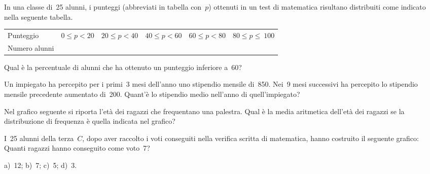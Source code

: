 \begin{esercizio}
\label{ese:A.53}
In una classe di~25 alunni, i punteggi (abbreviati in tabella con~$p$) 
ottenuti in un test di matematica risultano distribuiti come indicato nella 
seguente tabella.
\begin{center}
 \begin{tabular}{l*{5}{c}}
\toprule
Punteggio & $0 \leq p < 20$ & $20 \leq p < 40$ & $40 \leq p < 60$ & $60 
\leq p < 80$ & $80 \leq p \leq~100$ \\
Numero alunni & & & & & \\
\bottomrule
\end{tabular}
\end{center}
Qual è la percentuale di alunni che ha ottenuto un punteggio inferiore a~60?
\end{esercizio}

\begin{esercizio}
\label{ese:A.54}
Un impiegato ha percepito per i primi~3 mesi dell'anno uno stipendio 
mensile di~850\officialeuro . Nei~9 mesi successivi ha percepito
lo stipendio mensile precedente aumentato di~200\officialeuro . Quant'è lo 
stipendio medio nell'anno di quell'impiegato?
\end{esercizio}

\begin{multicols}{2}
\begin{esercizio}
\label{ese:A.55}
Nel grafico seguente si riporta l'età dei ragazzi che frequentano una 
palestra. Qual è la media aritmetica dell'età dei ragazzi
se la distribuzione di frequenza è quella indicata nel grafico?
\begin{center}
 
\end{center}
\end{esercizio}
\end{multicols}

\begin{multicols}{2}
\begin{esercizio}
\label{ese:A.56}
I~25 alunni della terza~$C$, dopo aver raccolto i voti conseguiti
nella verifica scritta di matematica, hanno costruito il seguente grafico:
Quanti ragazzi hanno conseguito come voto~7?

a)~12; \quad b)~7; \quad c)~5; \quad d)~3.
\begin{center}
 
\end{center}
\end{esercizio}
\end{multicols}

